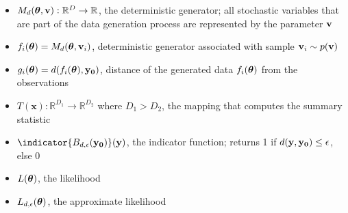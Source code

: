 \begin{itemize}
\item $M_d(\boldsymbol{\theta}, \mathbf{v}): \mathbb{R}^D \rightarrow \mathbb{R}$, the deterministic
  generator; all stochastic variables that are part of the data generation process are represented by the parameter $\mathbf{v}$
\item $f_i(\boldsymbol{\theta}) = M_d(\boldsymbol{\theta}, \mathbf{v}_i)$, deterministic generator associated with sample $\mathbf{v}_i \sim p(\mathbf{v})$
\item $g_i(\boldsymbol{\theta}) = d(f_i(\boldsymbol{\theta}), \mathbf{y_0})$, distance of the generated data $f_i(\boldsymbol{\theta})$ from the observations
\item $T(\mathbf{x}): \mathbb{R}^{D_1} \rightarrow \mathbb{R}^{D_2}$
  where $D_1 > D_2$, the mapping that computes the summary statistic
\item $\indicator{\region(\data)}(\yb)$, the indicator function; returns 1 if $d(\mathbf{y}, \mathbf{y_0}) \leq \epsilon$, else 0
\item $L(\boldsymbol{\theta})$, the likelihood
\item $L_{d,\epsilon}(\boldsymbol{\theta})$, the approximate likelihood
\end{itemize}
